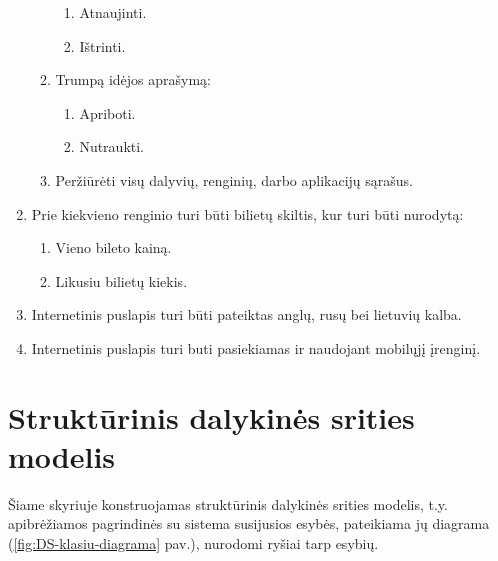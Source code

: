 \documentclass{VUMIFPSkursinis}
\begin{document}
\begin{enumerate}[label=\textbf{FR\arabic*}]
\begin{enumerate}[label*=\textbf{.\arabic*}]
\begin{enumerate}[label*=\textbf{.\arabic*}]
						        \item Atnaujinti.
						        \item Ištrinti.
						    \end{enumerate}
						\item Trumpą idėjos aprašymą:
                            \begin{enumerate}[label*=\textbf{.\arabic*}]
						        \item Apriboti.
						        \item Nutraukti.
						    \end{enumerate}
						\item Peržiūrėti visų dalyvių, renginių, darbo aplikacijų sąrašus.
					\end{enumerate}
			    \item Prie kiekvieno renginio turi būti bilietų skiltis, kur turi būti nurodytą:
					\begin{enumerate}[label*=\textbf{.\arabic*}]
						\item Vieno bileto kainą.
						\item Likusiu bilietų kiekis.
					\end{enumerate}
				\item Internetinis puslapis turi būti pateiktas anglų, rusų bei lietuvių kalba.
				\item  Internetinis puslapis turi buti pasiekiamas ir naudojant mobilųjį įrenginį.
			\end{enumerate}

    \section{Struktūrinis dalykinės srities modelis} \label{strukturinisDSModelis}
		Šiame skyriuje konstruojamas struktūrinis dalykinės srities modelis, t.y. apibrėžiamos pagrindinės su sistema susijusios esybės, pateikiama jų diagrama (\ref{fig:DS-klasiu-diagrama} pav.), nurodomi ryšiai tarp esybių.
\end{document}
